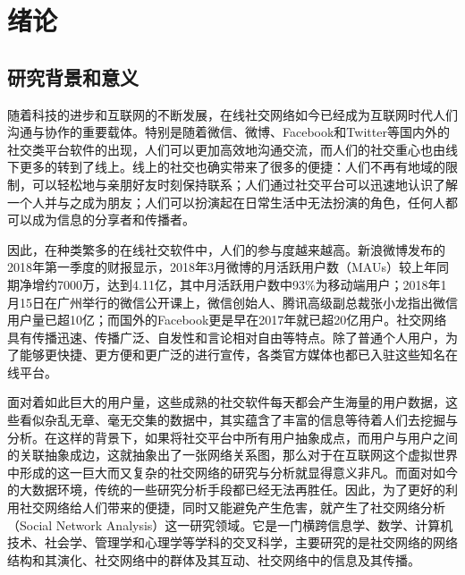 \chapter{绪论}

\section{研究背景和意义}%
随着科技的进步和互联网的不断发展，在线社交网络如今已经成为互联网时代人们沟通与协作的重要载体。特别是随着微信、微博、Facebook和Twitter等国内外的社交类平台软件的出现，人们可以更加高效地沟通交流，而人们的社交重心也由线下更多的转到了线上。线上的社交也确实带来了很多的便捷：人们不再有地域的限制，可以轻松地与亲朋好友时刻保持联系；人们通过社交平台可以迅速地认识了解一个人并与之成为朋友；人们可以扮演起在日常生活中无法扮演的角色，任何人都可以成为信息的分享者和传播者。

因此，在种类繁多的在线社交软件中，人们的参与度越来越高。新浪微博发布的2018年第一季度的财报显示，2018年3月微博的月活跃用户数（MAUs）较上年同期净增约7000万，达到4.11亿，其中月活跃用户数中93\%为移动端用户；2018年1月15日在广州举行的微信公开课上，微信创始人、腾讯高级副总裁张小龙指出微信用户量已超10亿；而国外的Facebook更是早在2017年就已超20亿用户。社交网络具有传播迅速、传播广泛、自发性和言论相对自由等特点。除了普通个人用户，为了能够更快捷、更方便和更广泛的进行宣传，各类官方媒体也都已入驻这些知名在线平台。

面对着如此巨大的用户量，这些成熟的社交软件每天都会产生海量的用户数据，这些看似杂乱无章、毫无交集的数据中，其实蕴含了丰富的信息等待着人们去挖掘与分析。在这样的背景下，如果将社交平台中所有用户抽象成点，而用户与用户之间的关联抽象成边，这就抽象出了一张网络关系图，那么对于在互联网这个虚拟世界中形成的这一巨大而又复杂的社交网络的研究与分析就显得意义非凡。而面对如今的大数据环境，传统的一些研究分析手段都已经无法再胜任。因此，为了更好的利用社交网络给人们带来的便捷，同时又能避免产生危害，就产生了社交网络分析（Social Network Analysis）这一研究领域。它是一门横跨信息学、数学、计算机技术、社会学、管理学和心理学等学科的交叉科学，主要研究的是社交网络的网络结构和其演化、社交网络中的群体及其互动、社交网络中的信息及其传播。


